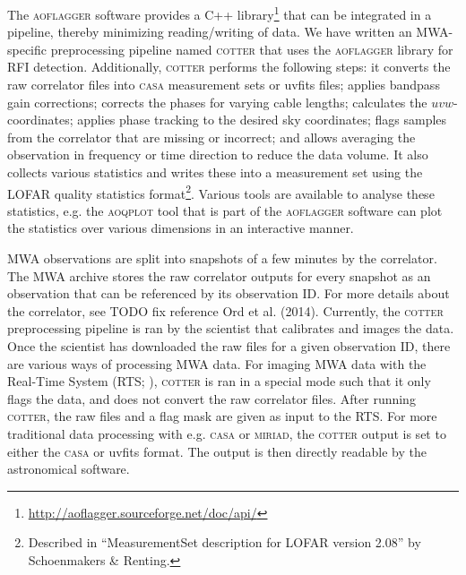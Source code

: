 \documentclass[useAMS,usenatbib]{mn2e}
\begin{document}
The \textsc{aoflagger} software provides a C++ library\footnote{\url{http://aoflagger.sourceforge.net/doc/api/}} that can be integrated in a pipeline, thereby minimizing reading/writing of data. We have written an MWA-specific preprocessing pipeline named \textsc{cotter} that uses the \textsc{aoflagger} library for RFI detection. Additionally, \textsc{cotter} performs the following steps: it converts the raw correlator files into \textsc{casa} measurement sets or uvfits files; applies bandpass gain corrections; corrects the phases for varying cable lengths; calculates the $uvw$-coordinates; applies phase tracking to the desired sky coordinates; flags samples from the correlator that are missing or incorrect; and allows averaging the observation in frequency or time direction to reduce the data volume. It also collects various statistics and writes these into a measurement set using the LOFAR quality statistics format\footnote{Described in ``MeasurementSet description for LOFAR version 2.08'' by Schoenmakers \& Renting.}. Various tools are available to analyse these statistics, e.g. the \textsc{aoqplot} tool that is part of the \textsc{aoflagger} software can plot the statistics over various dimensions in an interactive manner.

MWA observations are split into snapshots of a few minutes by the correlator. The MWA archive stores the raw correlator outputs for every snapshot as an observation that can be referenced by its observation ID. For more details about the correlator, see TODO fix reference Ord et al. (2014). Currently, the \textsc{cotter} preprocessing pipeline is ran by the scientist that calibrates and images the data. Once the scientist has downloaded the raw files for a given observation ID, there are various ways of processing MWA data. For imaging MWA data with the Real-Time System (RTS; \citealt{rts-mwa-2008}), \textsc{cotter} is ran in a special mode such that it only flags the data, and does not convert the raw correlator files. After running \textsc{cotter}, the raw files and a flag mask are given as input to the RTS. For more traditional data processing with e.g. \textsc{casa} or \textsc{miriad}, the \textsc{cotter} output is set to either the \textsc{casa} or uvfits format. The output is then directly readable by the astronomical software.
\end{document}
